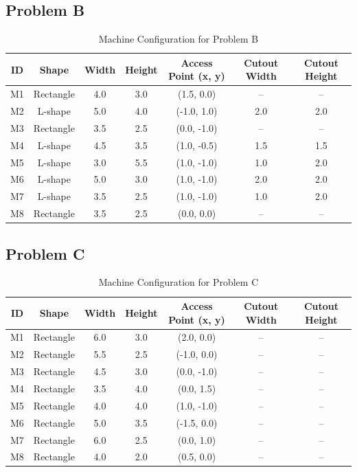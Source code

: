\subsection{Problem B}
\begin{table}[H]
\centering
\small
\begin{tabular}{ccccccc}
\toprule
\textbf{ID} & \textbf{Shape} & \textbf{Width} & \textbf{Height} & \textbf{Access Point (x, y)} & \textbf{Cutout Width} & \textbf{Cutout Height} \\
\midrule
M1 & Rectangle & 4.0 & 3.0 & (1.5, 0.0)   & --   & --   \\
M2 & L-shape   & 5.0 & 4.0 & (-1.0, 1.0)  & 2.0  & 2.0  \\
M3 & Rectangle & 3.5 & 2.5 & (0.0, -1.0)  & --   & --   \\
M4 & L-shape   & 4.5 & 3.5 & (1.0, -0.5)  & 1.5  & 1.5  \\
M5 & L-shape   & 3.0 & 5.5 & (1.0, -1.0)  & 1.0  & 2.0  \\
M6 & L-shape   & 5.0 & 3.0 & (1.0, -1.0)  & 2.0  & 2.0  \\
M7 & L-shape   & 3.5 & 2.5 & (1.0, -1.0)  & 1.0  & 2.0  \\
M8 & Rectangle & 3.5 & 2.5 & (0.0, 0.0)   & --   & --   \\
\bottomrule
\end{tabular}
\caption{Machine Configuration for Problem B}
\label{tab:machine_config_b}
\end{table}

\subsection{Problem C}
\begin{table}[H]
\centering
\small
\begin{tabular}{ccccccc}
\toprule
\textbf{ID} & \textbf{Shape} & \textbf{Width} & \textbf{Height} & \textbf{Access Point (x, y)} & \textbf{Cutout Width} & \textbf{Cutout Height} \\
\midrule
M1 & Rectangle & 6.0 & 3.0 & (2.0, 0.0)   & -- & -- \\
M2 & Rectangle & 5.5 & 2.5 & (-1.0, 0.0)  & -- & -- \\
M3 & Rectangle & 4.5 & 3.0 & (0.0, -1.0)  & -- & -- \\
M4 & Rectangle & 3.5 & 4.0 & (0.0, 1.5)   & -- & -- \\
M5 & Rectangle & 4.0 & 4.0 & (1.0, -1.0)  & -- & -- \\
M6 & Rectangle & 5.0 & 3.5 & (-1.5, 0.0)  & -- & -- \\
M7 & Rectangle & 6.0 & 2.5 & (0.0, 1.0)   & -- & -- \\
M8 & Rectangle & 4.0 & 2.0 & (0.5, 0.0)   & -- & -- \\
\bottomrule
\end{tabular}
\caption{Machine Configuration for Problem C}
\label{tab:machine_config_c}
\end{table}

